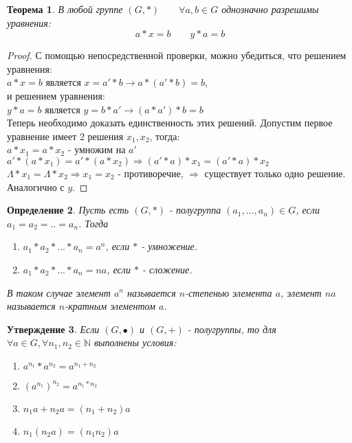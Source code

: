 \documentclass[12pt,oneside]{article}
\newtheorem{theorem}{Теорема}[section]
\newtheorem{determ}[theorem]{Определение}
\newtheorem{iwantthat}[theorem]{Утверждение}
\theoremstyle{definition}
\newcommand{\NN}{\mathbb{N}}
\begin{document}
\begin{theorem}
	В любой группе $(G,*) \qquad \forall a,b \in G$ однозначно разрешимы уравнения:\\
	\begin{equation}
		a*x=b \qquad y*a=b
	\end{equation}
\end{theorem}
\begin{proof}
	С помощью непосредственной проверки, можно убедиться, что решением уравнения:\\
	$a*x=b$ является $x=a'*b \rightarrow a*(a'*b)=b$, \\
	и  решением уравнения:\\
	$y*a=b$ является $y=b*a' \rightarrow (a*a')*b=b$\\
	
	Теперь необходимо доказать единственность этих решений. Допустим первое уравнение имеет $2$ решения $x_1, x_2$, тогда:\\
	$a*x_1=a*x_2$ - умножим на $a'$\\
	$a'*(a*x_1)=a'*(a*x_2) \Rightarrow (a'*a)*x_1=(a'*a)*x_2$\\
	$\Lambda*x_1=\Lambda *x_2 \Rightarrow x_1=x_2$ - противоречие, $\Rightarrow$ существует только одно решение. Аналогично с $y$.	
\end{proof}

\begin{determ}
	Пусть есть $(G,*)$ - полугруппа $(a_1,...,a_n)\in G$, если $a_1=a_2=..=a_n$. Тогда
	\begin{enumerate}
		\item  $a_1*a_2*...*a_n=a^n$, если $*$ - умножение.
		\item $a_1*a_2*...*a_n=na$, если $*$ - сложение.
	\end{enumerate}
	В таком случае элемент $a^n$ называется $n$-степенью элемента $a$, элемент $na$ называется $n$-кратным элементом $a$.
\end{determ}

\begin{iwantthat}
	Если $(G,\bullet)$ и $(G,+)$ - полугруппы, то для $\forall a \in G, \forall n_1, n_2 \in \NN$ выполнены условия:
	\begin{enumerate}
		\item $a^{n_1}*a^{n_2}=a^{n_1+n_2}$
		\item $(a^{n_1})^{n_2}=a^{n_1*n_2}$
		\item $n_1a+n_2a=(n_1+n_2)a$
		\item $n_1(n_2a)=(n_1n_2)a$
	\end{enumerate}
\end{iwantthat}
\end{document}
